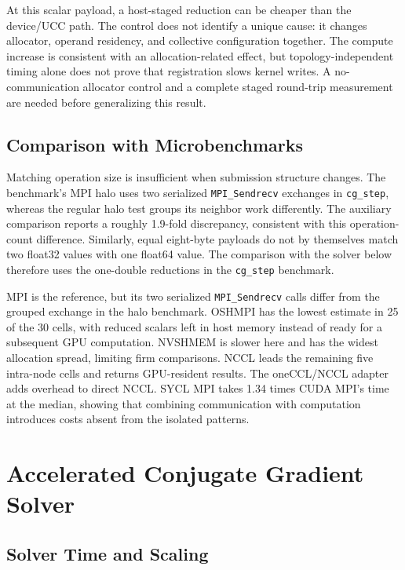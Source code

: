 At this scalar payload, a host-staged reduction can be cheaper than the device/UCC path. The control does not identify a unique cause: it changes allocator, operand residency, and collective configuration together. The compute increase is consistent with an allocation-related effect, but topology-independent timing alone does not prove that registration slows kernel writes. A no-communication allocator control and a complete staged round-trip measurement are needed before generalizing this result.

\subsection{Comparison with Microbenchmarks}\label{sec:cg-comparison-micro}

Matching operation size is insufficient when submission structure changes. The benchmark's MPI halo uses two serialized \texttt{MPI\_Sendrecv} exchanges in \texttt{cg\_step}, whereas the regular halo test groups its neighbor work differently. The auxiliary comparison reports a roughly 1.9-fold discrepancy, consistent with this operation-count difference. Similarly, equal eight-byte payloads do not by themselves match two float32 values with one float64 value. The comparison with the solver below therefore uses the one-double reductions in the \texttt{cg\_step} benchmark.

\begin{keypoint}
MPI is the reference, but its two serialized \texttt{MPI\_Sendrecv} calls differ from the grouped exchange in the halo benchmark. OSHMPI has the lowest estimate in 25 of the 30 cells, with reduced scalars left in host memory instead of ready for a subsequent GPU computation. NVSHMEM is slower here and has the widest allocation spread, limiting firm comparisons. NCCL leads the remaining five intra-node cells and returns GPU-resident results. The oneCCL/NCCL adapter adds overhead to direct NCCL. SYCL MPI takes 1.34 times CUDA MPI's time at the median, showing that combining communication with computation introduces costs absent from the isolated patterns.
\end{keypoint}

\section{Accelerated Conjugate Gradient Solver}\label{sec:acg-results}

\subsection{Solver Time and Scaling}


